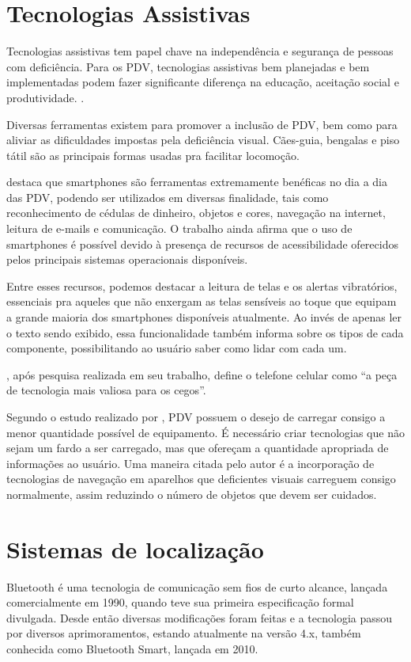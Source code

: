 \documentclass[english,brazilian]{UNISINOSmonografia}
\begin{document}
	\section{Tecnologias Assistivas}
Tecnologias assistivas tem papel chave na independência e segurança de pessoas com deficiência. Para os PDV, tecnologias assistivas bem planejadas e bem implementadas podem fazer significante diferença na educação, aceitação social e produtividade. .


Diversas ferramentas existem para promover a inclusão de PDV, bem como para aliviar as dificuldades impostas pela deficiência visual. Cães-guia, bengalas e piso tátil são as principais formas usadas pra facilitar locomoção.

 destaca que smartphones são ferramentas extremamente benéficas no dia a dia das PDV, podendo ser utilizados em diversas finalidade, tais como reconhecimento de cédulas de dinheiro, objetos e cores, navegação na internet, leitura de e-mails e comunicação. O trabalho ainda afirma que o uso de smartphones é possível devido à presença de recursos de acessibilidade oferecidos pelos principais sistemas operacionais disponíveis. 

Entre esses recursos, podemos destacar a leitura de telas e os alertas vibratórios, essenciais pra aqueles que não enxergam as telas sensíveis ao toque que equipam a grande maioria dos smartphones disponíveis atualmente. Ao invés de apenas ler o texto sendo exibido, essa funcionalidade também informa sobre os tipos de cada componente, possibilitando ao usuário saber como lidar com cada um.

, após pesquisa realizada em seu trabalho, define o telefone celular como “a peça de tecnologia mais valiosa para os cegos”. 

Segundo o estudo realizado por , PDV possuem o desejo de carregar consigo a menor quantidade possível de equipamento. É necessário criar tecnologias que não sejam um fardo a ser carregado, mas que ofereçam a quantidade apropriada de informações ao usuário. Uma maneira citada pelo autor é a incorporação de tecnologias de navegação em aparelhos que deficientes visuais carreguem consigo normalmente, assim reduzindo o número de objetos que devem ser cuidados.
	
	\section{Sistemas de localização}
Bluetooth é uma tecnologia de comunicação sem fios de curto alcance, lançada comercialmente em 1990, quando teve sua primeira especificação formal divulgada. Desde então diversas modificações foram feitas e a tecnologia passou por diversos aprimoramentos, estando atualmente na versão 4.x, também conhecida como Bluetooth Smart, lançada em 2010. 
\end{document}
